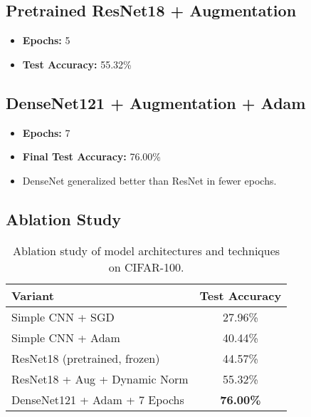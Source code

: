 \subsection*{Pretrained ResNet18 + Augmentation}
\begin{itemize}
    \item \textbf{Epochs:} 5
    \item \textbf{Test Accuracy:} 55.32\%
\end{itemize}

\subsection*{DenseNet121 + Augmentation + Adam}
\begin{itemize}
    \item \textbf{Epochs:} 7
    \item \textbf{Final Test Accuracy:} 76.00\%
    \item DenseNet generalized better than ResNet in fewer epochs.
\end{itemize}

\subsection*{Ablation Study}
\begin{table}[h!]
\centering
\begin{tabular}{|l|c|}
\hline
\textbf{Variant} & \textbf{Test Accuracy} \\
\hline
Simple CNN + SGD & 27.96\% \\
Simple CNN + Adam & 40.44\% \\
ResNet18 (pretrained, frozen) & 44.57\% \\
ResNet18 + Aug + Dynamic Norm & 55.32\% \\
DenseNet121 + Adam + 7 Epochs & \textbf{76.00\%} \\
\hline
\end{tabular}
\caption{Ablation study of model architectures and techniques on CIFAR-100.}
\end{table}
